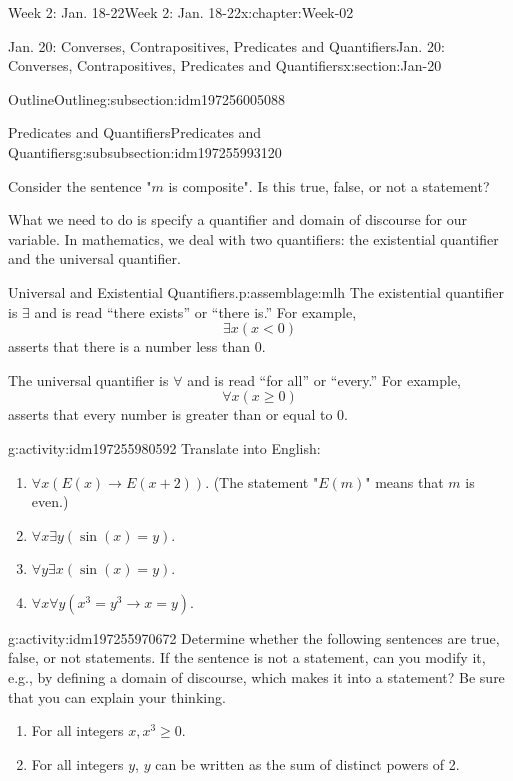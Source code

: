 \documentclass[oneside,10pt,]{book}
\numberwithin{equation}{section}
\renewcommand{\ge}{\geqslant}
\def\imp{\to}
\newcommand{\imp}{\rightarrow}
\newcommand{\lt}{<}
\begin{document}
\begin{chapterptx}{Week 2: Jan. 18-22}{}{Week 2: Jan. 18-22}{}{}{x:chapter:Week-02}
\begin{sectionptx}{Jan. 20: Converses, Contrapositives, Predicates and Quantifiers}{}{Jan. 20: Converses, Contrapositives, Predicates and Quantifiers}{}{}{x:section:Jan-20}
\begin{subsectionptx}{Outline}{}{Outline}{}{}{g:subsection:idm197256005088}
\begin{subsubsectionptx}{Predicates and Quantifiers}{}{Predicates and Quantifiers}{}{}{g:subsubsection:idm197255993120}
\par
Consider the sentence "\(m\) is composite". Is this true, false, or not a statement?%
\par
What we need to do is specify a quantifier and domain of discourse for our variable. In mathematics, we deal with two quantifiers: the existential quantifier and the universal quantifier.%
\begin{assemblage}{Universal and Existential Quantifiers.}{p:assemblage:mlh}%
The existential quantifier is \(\exists\) and is read ``there exists'' or ``there is.'' For example, \label{g:notation:idm197255982128}%
\begin{equation*}
\exists x (x \lt 0)
\end{equation*}
asserts that there is a number less than 0.%
\par
The universal quantifier is \(\forall\) and is read ``for all'' or ``every.'' For example, \label{g:notation:idm197255976640}%
\begin{equation*}
\forall x (x \ge 0)
\end{equation*}
asserts that every number is greater than or equal to 0.%
\end{assemblage}
\begin{activity}{}{g:activity:idm197255980592}%
Translate into English:%
\begin{enumerate}
\item{}\(\forall x (E(x) \imp E(x +2))\). (The statement "\(E(m)\)" means that \(m\) is even.)%
\item{}\(\forall x \exists y (\sin(x) = y)\).%
\item{}\(\forall y \exists x (\sin(x) = y)\).%
\item{}\(\forall x \forall y (x^3 = y^3 \imp x = y)\).%
\end{enumerate}
%
\end{activity}%
\begin{activity}{}{g:activity:idm197255970672}%
Determine whether the following sentences are true, false, or not statements. If the sentence is not a statement, can you modify it, e.g., by defining a domain of discourse, which makes it into a statement? Be sure that you can explain your thinking.%
%
\begin{enumerate}
\item{}For all integers \(x, x^3 \ge 0\).%
\item{}For all integers \(y\), \(y\) can be written as the sum of distinct powers of 2.%

\end{enumerate}
\end{activity}
\end{subsubsectionptx}
\end{subsectionptx}
\end{sectionptx}
\end{chapterptx}
\end{document}

